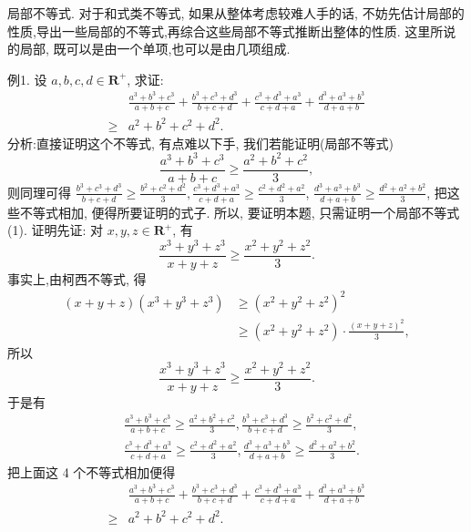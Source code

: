 
局部不等式.
对于和式类不等式, 如果从整体考虑较难人手的话, 不妨先估计局部的性质,导出一些局部的不等式,再综合这些局部不等式推断出整体的性质.
这里所说的局部, 既可以是由一个单项,也可以是由几项组成.



例1. 设 $a, b, c, d \in \mathbf{R}^{+}$, 求证:
$$
\begin{aligned}
& \frac{a^3+b^3+c^3}{a+b+c}+\frac{b^3+c^3+d^3}{b+c+d}+\frac{c^3+d^3+a^3}{c+d+a}+\frac{d^3+a^3+b^3}{d+a+b} \\
\geqslant & a^2+b^2+c^2+d^2 .
\end{aligned}
$$
分析:直接证明这个不等式, 有点难以下手, 我们若能证明(局部不等式)
$$
\frac{a^3+b^3+c^3}{a+b+c} \geqslant \frac{a^2+b^2+c^2}{3}, \label{(1)}
$$
则同理可得 $\frac{b^3+c^3+d^3}{b+c+d} \geqslant \frac{b^2+c^2+d^2}{3}, \frac{c^3+d^3+a^3}{c+d+a} \geqslant \frac{c^2+d^2+a^2}{3}$, $\frac{d^3+a^3+b^3}{d+a+b} \geqslant \frac{d^2+a^2+b^2}{3}$, 把这些不等式相加, 便得所要证明的式子.
所以, 要证明本题, 只需证明一个局部不等式(1).
证明先证: 对 $x, y, z \in \mathbf{R}^{+}$, 有
$$
\frac{x^3+y^3+z^3}{x+y+z} \geqslant \frac{x^2+y^2+z^2}{3} .
$$
事实上,由柯西不等式, 得
$$
\begin{aligned}
(x+y+z)\left(x^3+y^3+z^3\right) & \geqslant\left(x^2+y^2+z^2\right)^2 \\
& \geqslant\left(x^2+y^2+z^2\right) \cdot \frac{(x+y+z)^2}{3},
\end{aligned}
$$
所以
$$
\frac{x^3+y^3+z^3}{x+y+z} \geqslant \frac{x^2+y^2+z^2}{3} .
$$
于是有
$$
\begin{aligned}
& \frac{a^3+b^3+c^3}{a+b+c} \geqslant \frac{a^2+b^2+c^2}{3}, \frac{b^3+c^3+d^3}{b+c+d} \geqslant \frac{b^2+c^2+d^2}{3}, \\
& \frac{c^3+d^3+a^3}{c+d+a} \geqslant \frac{c^2+d^2+a^2}{3}, \frac{d^3+a^3+b^3}{d+a+b} \geqslant \frac{d^2+a^2+b^2}{3} .
\end{aligned}
$$
把上面这 4 个不等式相加便得
$$
\begin{aligned}
& \frac{a^3+b^3+c^3}{a+b+c}+\frac{b^3+c^3+d^3}{b+c+d}+\frac{c^3+d^3+a^3}{c+d+a}+\frac{d^3+a^3+b^3}{d+a+b} \\
\geqslant & a^2+b^2+c^2+d^2 .
\end{aligned}
$$



